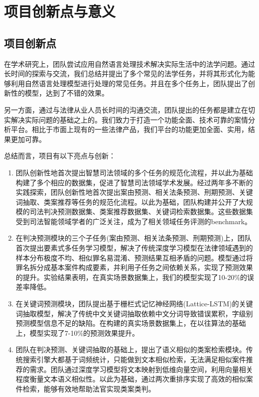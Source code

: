 \chapter{项目创新点与意义}
\label{cha: significance}

\section{项目创新点}

在学术研究上，团队尝试应用自然语言处理技术解决实际生活中的法学问题。通过长时间的探索与交流，我们总结并提出了多个常见的法学任务，并将其形式化为能够利用自然语言处理模型进行处理的常见任务。并且在多个任务上，团队提出了创新性的模型，达到了不错的效果。

另一方面，通过与法律从业人员长时间的沟通交流，团队提出的任务都是建立在切实解决实际问题的基础之上的。我们致力于打造一个功能全面、技术可靠的案情分析平台。相比于市面上现有的一些法律产品，我们平台的功能更加全面、实用，结果更加可靠。

总结而言，项目有以下亮点与创新：

\begin{enumerate}[1)]
	\item 团队创新性地首次提出智慧司法领域的多个任务的规范化流程，并以此为基础构建了多个相应的数据集，促进了智慧司法领域学术发展。经过两年多不断的实践探索，团队创新性地首次提出案由预测、相关法条预测、刑期预测、关键词抽取、类案推荐等任务的规范化流程。以此为基础，团队构建并公开了大规模的司法判决预测数据集、类案推荐数据集、关键词检索数据集。这些数据集受到司法智能领域学者的广泛关注，成为了相关领域任务评测的benchmark。
	\item 在判决预测模块的三个子任务(案由预测、相关法条预测、刑期预测)上，团队首次提出要素式多任务学习模型，解决了传统深度学习模型在法律领域遇到的样本分布极度不均、相似罪名易混淆、预测结果互相矛盾的问题。模型通过将罪名拆分成基本案件构成要素，并利用子任务之间依赖关系，实现了预测效果的提升。实验结果表明，在真实场景数据集上，我们的模型实现了10-20\%的误差率降低。
	\item 在关键词预测模块，团队提出基于栅栏式记忆神经网络(Lattice-LSTM)的关键词抽取模型，解决了传统中文关键词抽取依赖中文分词导致错误累积，字级别预测模型信息不足的缺陷。在构建的真实场景数据集上，在以往算法的基础上，模型实现了7-10\%的预测效果提升。
	\item 团队在判决预测、关键词抽取的基础上，提出了语义相似的类案检索模块。传统搜索引擎大都基于词频统计，只能做到文本相似检索，无法满足相似案件推荐的需求。团队通过深度学习模型将文本映射到低维向量空间，利用向量相关程度衡量文本语义相似性。以此为基础，通过两次重排序实现了高效的相似案件检索，能够有效地帮助法官实现类案类判。
\end{enumerate}

